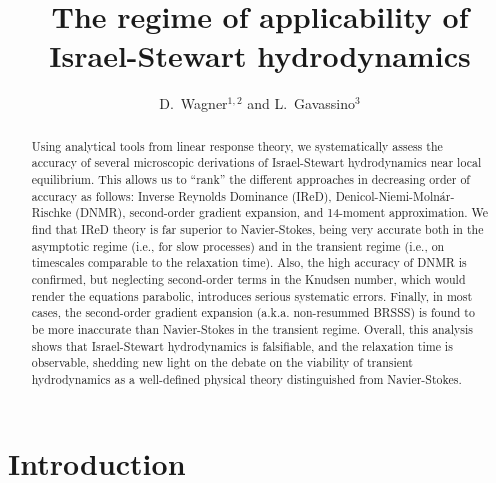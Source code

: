 \documentclass[a4paper, amsfonts, amssymb, amsmath, reprint, showkeys, nofootinbib, twoside, onecolumn,notitlepage]{revtex4-2}
\begin{document}
\title{The regime of applicability of Israel-Stewart hydrodynamics}
\author{D.~Wagner$^{1,2}$ and L.~Gavassino$^3$}


\begin{abstract}
Using analytical tools from linear response theory, we systematically assess the accuracy of several microscopic derivations of Israel-Stewart hydrodynamics near local equilibrium. This allows us to ``rank'' the different approaches in decreasing order of accuracy as follows: Inverse Reynolds Dominance (IReD), Denicol-Niemi-Molnár-Rischke (DNMR), second-order gradient expansion, and 14-moment approximation. We find that IReD theory is far superior to Navier-Stokes, being very accurate both in the asymptotic regime (i.e., for slow processes) and in the transient regime (i.e., on timescales comparable to the relaxation time). Also, the high accuracy of DNMR is confirmed, but neglecting second-order terms in the Knudsen number, which would render the equations parabolic, introduces serious systematic errors. Finally, {in most cases}, the second-order gradient expansion (a.k.a. non-resummed BRSSS) is {found} to be more inaccurate than Navier-Stokes in the transient regime. Overall, this analysis shows that Israel-Stewart hydrodynamics is falsifiable, and the relaxation time is observable, {shedding new light on} the debate on the viability of transient hydrodynamics as a well-defined physical theory distinguished from Navier-Stokes.
\end{abstract} 



\maketitle




\section{Introduction} 
\end{document}
